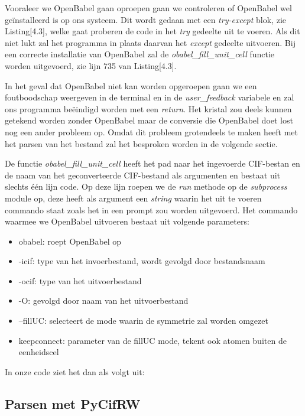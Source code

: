 

Vooraleer we OpenBabel gaan oproepen gaan we controleren of OpenBabel wel geïnstalleerd is op ons systeem. Dit wordt gedaan met een \textit{try-except} blok, zie Listing[4.3], welke gaat proberen de code in het \textit{try} gedeelte uit te voeren. Als dit niet lukt zal het programma in plaats daarvan het \textit{except} gedeelte uitvoeren. Bij een correcte installatie van OpenBabel zal de \textit{obabel\_fill\_unit\_cell} functie worden uitgevoerd, zie lijn 735 van Listing[4.3].
\par
In het geval dat OpenBabel niet kan worden opgeroepen gaan we een foutboodschap weergeven in de terminal en in de \textit{user\_feedback} variabele en zal ons programma beëindigd worden met een \textit{return}. Het kristal zou deels kunnen getekend worden zonder OpenBabel maar de conversie die OpenBabel doet lost nog een ander probleem op. Omdat dit probleem grotendeels te maken heeft met het parsen van het bestand zal het besproken worden in de volgende sectie.


\par	
De functie \textit{obabel\_fill\_unit\_cell} heeft het pad naar het ingevoerde CIF-bestan en de naam van het geconverteerde CIF-bestand als argumenten en bestaat uit slechts één lijn code. Op deze lijn roepen we de \textit{run} methode op de \textit{subprocess} module op, deze heeft als argument een \textit{string} waarin het uit te voeren commando staat zoals het in een prompt zou worden uitgevoerd. Het commando waarmee we OpenBabel uitvoeren bestaat uit volgende parameters:
\begin{itemize}
\item obabel: roept OpenBabel op
\item -icif: type van het invoerbestand, wordt gevolgd door bestandsnaam
\item -ocif: type van het uitvoerbestand
\item -O: gevolgd door naam van het uitvoerbestand
\item --fillUC: selecteert de mode waarin de symmetrie zal worden omgezet
\item keepconnect: parameter van de fillUC mode, tekent ook atomen buiten de eenheidscel
\end{itemize}
In onze code ziet het dan als volgt uit:


\subsection{Parsen met PyCifRW}



 





